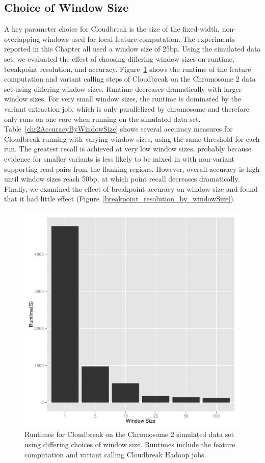 \subsection{Choice of Window Size}\label{section_window_size}

A key parameter choice for Cloudbreak is the size of the fixed-width, non-overlapping windows used for local feature computation. The experiments reported in this Chapter all used a window size of 25bp. Using the simulated data set, we evaluated the effect of choosing differing window sizes on runtime, breakpoint resolution, and accuracy. Figure~\ref{figure_runtime_by_window_size} shows the runtime of the feature computation and variant calling steps of Cloudbreak on the Chromosome 2 data set using differing window sizes. Runtime decreases dramatically with larger window sizes. For very small window sizes, the runtime is dominated by the variant extraction job, which is only parallelized by chromosome and therefore only runs on one core when running on the simulated data set. Table~\ref{chr2AccuracyByWindowSize} shows several accuracy measures for Cloudbreak running with varying window sizes, using the same threshold for each run. The greatest recall is achieved at very low window sizes, probably because evidence for smaller variants is less likely to be mixed in with non-variant supporting read pairs from the flanking regions. However, overall accuracy is high until window sizes reach 50bp, at which point recall decreases dramatically. Finally, we examined the effect of breakpoint accuracy on window size and found that it had little effect (Figure~\ref{breakpoint_resolution_by_windowSize}).

\begin{figure}
\centering
\includegraphics[width=.8\textwidth]{figures/runtime_by_windowSize.pdf}
\caption{Runtimes for Cloudbreak on the Chromosome 2 simulated data set using differing choices of window size. Runtimes include the feature computation and variant calling Cloudbreak Hadoop jobs.}
\label{figure_runtime_by_window_size}
\end{figure}

